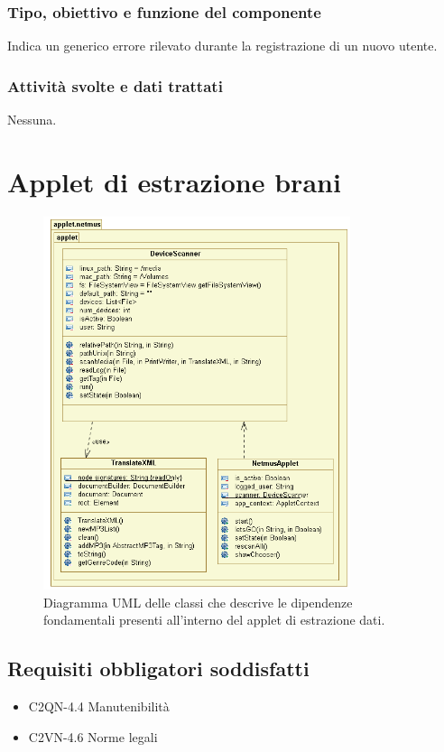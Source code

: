 \subsubsection*{Tipo, obiettivo e funzione del componente}
Indica un generico errore rilevato durante la registrazione di un nuovo utente.
\subsubsection*{Attivit\`a svolte e dati trattati}
Nessuna.


\newpage
\section{Applet di estrazione brani}

\begin{figure}[!h]
  \centering
  \includegraphics[width=9cm]{img/DP/applet.png}
\caption{Diagramma UML delle classi che descrive le dipendenze
fondamentali presenti all'interno del applet di estrazione dati.}
\end{figure}

\subsection*{Requisiti obbligatori soddisfatti}
\begin{itemize}
	\item C2QN-4.4 Manutenibilit\`a
	\item C2VN-4.6 Norme legali
\end{itemize}
